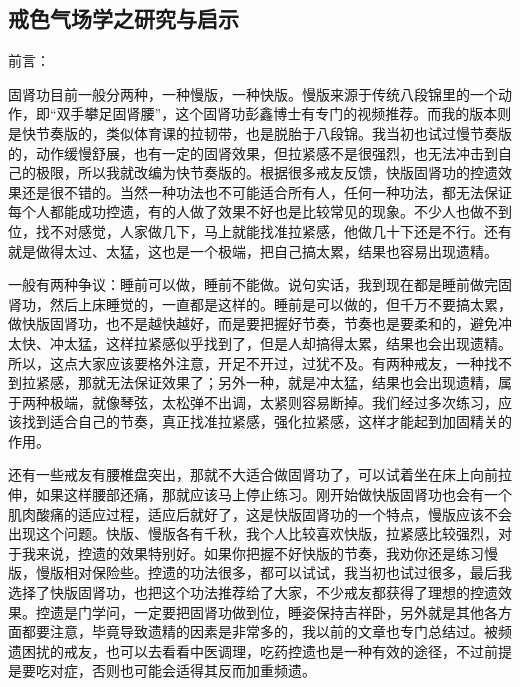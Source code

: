 \documentclass{ctexart}
\begin{document}
\subsection{戒色气场学之研究与启示}

前言：

固肾功目前一般分两种，一种慢版，一种快版。慢版来源于传统八段锦里的一个动作，即“双手攀足固肾腰”，这个固肾功彭鑫博士有专门的视频推荐。而我的版本则是快节奏版的，类似体育课的拉韧带，也是脱胎于八段锦。我当初也试过慢节奏版的，动作缓慢舒展，也有一定的固肾效果，但拉紧感不是很强烈，也无法冲击到自己的极限，所以我就改编为快节奏版的。根据很多戒友反馈，快版固肾功的控遗效果还是很不错的。当然一种功法也不可能适合所有人，任何一种功法，都无法保证每个人都能成功控遗，有的人做了效果不好也是比较常见的现象。不少人也做不到位，找不对感觉，人家做几下，马上就能找准拉紧感，他做几十下还是不行。还有就是做得太过、太猛，这也是一个极端，把自己搞太累，结果也容易出现遗精。

一般有两种争议：睡前可以做，睡前不能做。说句实话，我到现在都是睡前做完固肾功，然后上床睡觉的，一直都是这样的。睡前是可以做的，但千万不要搞太累，做快版固肾功，也不是越快越好，而是要把握好节奏，节奏也是要柔和的，避免冲太快、冲太猛，这样拉紧感似乎找到了，但是人却搞得太累，结果也会出现遗精。所以，这点大家应该要格外注意，开足不开过，过犹不及。有两种戒友，一种找不到拉紧感，那就无法保证效果了；另外一种，就是冲太猛，结果也会出现遗精，属于两种极端，就像琴弦，太松弹不出调，太紧则容易断掉。我们经过多次练习，应该找到适合自己的节奏，真正找准拉紧感，强化拉紧感，这样才能起到加固精关的作用。

还有一些戒友有腰椎盘突出，那就不大适合做固肾功了，可以试着坐在床上向前拉伸，如果这样腰部还痛，那就应该马上停止练习。刚开始做快版固肾功也会有一个肌肉酸痛的适应过程，适应后就好了，这是快版固肾功的一个特点，慢版应该不会出现这个问题。快版、慢版各有千秋，我个人比较喜欢快版，拉紧感比较强烈，对于我来说，控遗的效果特别好。如果你把握不好快版的节奏，我劝你还是练习慢版，慢版相对保险些。控遗的功法很多，都可以试试，我当初也试过很多，最后我选择了快版固肾功，也把这个功法推荐给了大家，不少戒友都获得了理想的控遗效果。控遗是门学问，一定要把固肾功做到位，睡姿保持吉祥卧，另外就是其他各方面都要注意，毕竟导致遗精的因素是非常多的，我以前的文章也专门总结过。被频遗困扰的戒友，也可以去看看中医调理，吃药控遗也是一种有效的途径，不过前提是要吃对症，否则也可能会适得其反而加重频遗。
\end{document}
